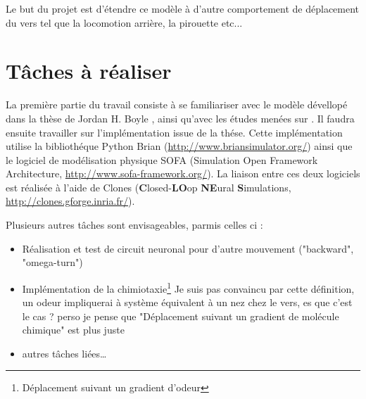 Le but du projet est d'étendre ce modèle à d'autre comportement de déplacement du vers tel que la locomotion arrière, la pirouette etc...


\section{Tâches à réaliser} %
\label{sec:Tâches à réaliser}

La première partie du travail consiste à se familiariser avec le modèle dévellopé dans la thèse de Jordan
H. Boyle \cite{Boyle2009}, ainsi qu'avec les études menées sur \celeg{}. Il faudra ensuite travailler sur
l'implémentation issue de la thése. Cette implémentation utilise la bibliothéque Python Brian
(\url{http://www.briansimulator.org/}) ainsi que le logiciel de modélisation physique SOFA
(Simulation Open Framework Architecture, \url{http://www.sofa-framework.org/}). La liaison entre ces
deux logiciels est réalisée à l'aide de Clones (\textbf{C}losed-\textbf{LO}op \textbf{NE}ural \textbf{S}imulations, 
\url{http://clones.gforge.inria.fr/}).

Plusieurs autres tâches sont envisageables, parmis celles ci :
\begin{itemize}
   \item Réalisation et test de circuit neuronal pour d'autre mouvement ("backward", "omega-turn")
   \item Implémentation de la chimiotaxie\footnote{Déplacement suivant un gradient d'odeur} Je suis pas convaincu par cette définition, un odeur impliquerai à système équivalent à un nez chez le vers, es que c'est le cas ? perso je pense que "Déplacement suivant un gradient de molécule chimique" est plus juste
   \item autres tâches liées\dots
\end{itemize}





